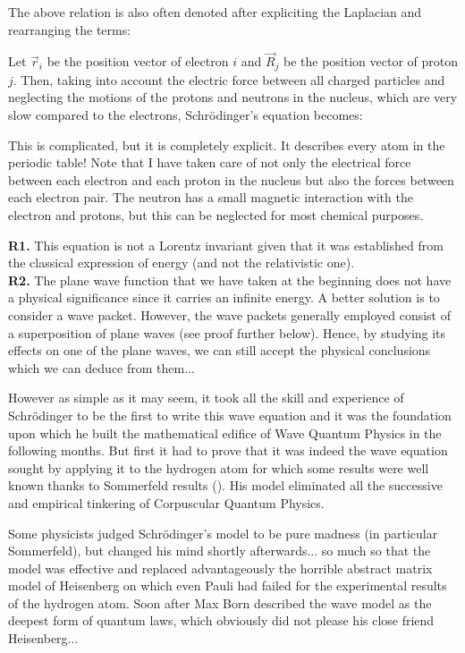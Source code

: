 	The above relation is also often denoted after expliciting the Laplacian and rearranging the terms:
	
	Let $\vec{r}_{i}$ be the position vector of electron $i$ and $\vec{R}_{j}$ be the position vector of proton $j$. Then, taking into account the electric force between all charged particles and neglecting the motions of the protons and neutrons in the nucleus, which are very slow compared to the electrons, Schrödinger's equation becomes:
	
	This is complicated, but it is completely explicit. It describes every atom in the periodic table! Note that I have taken care of not only the electrical force between each electron and each proton in the nucleus but also the forces between each electron pair. The neutron has a small magnetic interaction with the electron and protons, but this can be neglected for most chemical purposes.
	\begin{tcolorbox}[title=Remarks,colframe=black,arc=10pt]
	\textbf{R1.} This equation is not a Lorentz invariant given that it was established from the classical expression of energy (and not the relativistic one).\\
	
	\textbf{R2.} The plane wave function that we have taken at the beginning does not have a physical significance since it carries an infinite energy. A better solution is to consider a wave packet. However, the wave packets generally employed consist of a superposition of plane waves (see proof further below). Hence, by studying its effects on one of the plane waves, we can still accept the physical conclusions which we can deduce from them...
	\end{tcolorbox}
	However as simple as it may seem, it took all the skill and experience of Schrödinger to be the first to write this wave equation and it was the foundation upon which he built the mathematical edifice of Wave Quantum Physics in the following months. But first it had to prove that it was indeed the wave equation sought by applying it to the hydrogen atom for which some results were well known thanks to Sommerfeld results (). His model eliminated all the successive and empirical tinkering of Corpuscular Quantum Physics.

	Some physicists judged Schrödinger's model to be pure madness (in particular Sommerfeld), but changed his mind shortly afterwards... so much so that the model was effective and replaced advantageously the horrible abstract matrix model of Heisenberg on which even Pauli had failed for the experimental results of the hydrogen atom. Soon after Max Born described the wave model as the deepest form of quantum laws, which obviously did not please his close friend Heisenberg...
	
